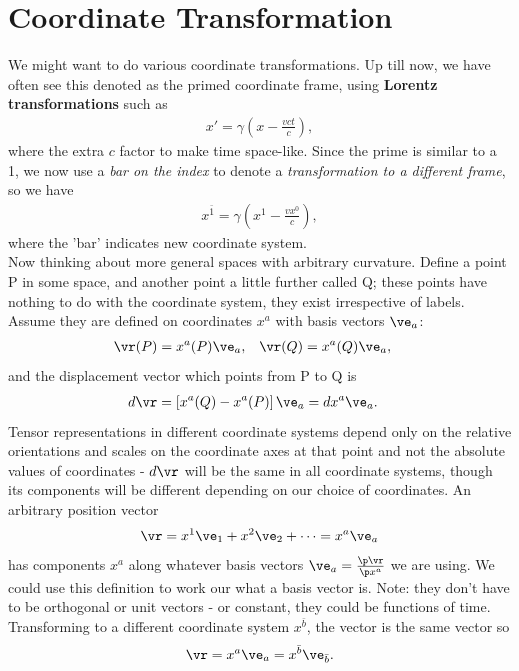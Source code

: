 \documentclass[a4paper, 11pt, normalem]{report}
\begin{document}
\section{Coordinate Transformation}
We might want to do various coordinate transformations. 
Up till now, we have often see this denoted as the primed coordinate frame, using \textbf{Lorentz transformations} such as
\begin{align}
    x' = \gamma\left(x-\frac{vct}{c}\right),
\end{align}
where the extra $c$ factor to make time space-like.
Since the prime is similar to a 1, we now use a \emph{bar on the index} to denote a \emph{transformation to a different frame}, so we have
\begin{align}
    x^{\bar{1}} = \gamma\left(x^1-\frac{vx^0}{c}\right),
\end{align}
where the 'bar' indicates new coordinate system.\\
Now thinking about more general spaces with arbitrary curvature. 
Define a point P in some space, and another point a little further called Q; these points have nothing to do with the coordinate system, they exist irrespective of labels. 
Assume they are defined on coordinates $x^a$ with basis vectors $\ve_a$:
\begin{align}
    \vr(P) &= x^a(P)\ve_a, & \vr(Q) &= x^a(Q)\ve_a, 
\end{align}
and the displacement vector which points from P to Q is
\begin{align}
    d\vr &= \left[x^a(Q)-x^a(P)\right]\ve_a = dx^a\ve_a.
\end{align}
Tensor representations in different coordinate systems depend only on the relative orientations and scales on the coordinate axes at that point and not the absolute values of coordinates - $d\vr$ will be the same in all coordinate systems, though its components will be different depending on our choice of coordinates. 
An arbitrary position vector
\begin{align}
    \vr = x^1\ve_1+x^2\ve_2+\dots = x^a\ve_a
\end{align}
has components $x^a$ along whatever basis vectors $\ve_a = \frac{\p\vr}{\p x^a}$ we are using.
We could use this definition to work our what a basis vector is. 
Note: they don't have to be orthogonal or unit vectors - or constant, they could be functions of time.
Transforming to a different coordinate system $x^{\bar{b}}$, the vector is the same vector so
\begin{align}
    \vr=x^a\ve_a=x^{\bar{b}}\ve_{\bar{b}}.
\end{align}
\end{document}
